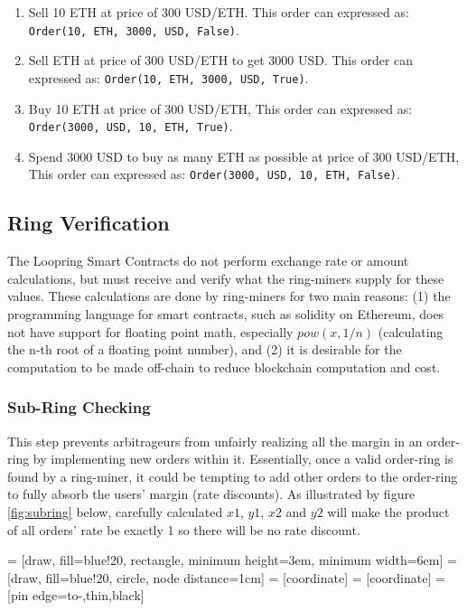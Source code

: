 \documentclass[UTF8,nofonts]{article}
\makeatletter
\newenvironment{figurehere}
 {\def\@captype{figure}}
 {}
\makeatother
\begin{document}
\begin{multicols}{2}
\begin{enumerate}
	\item Sell 10 ETH at price of 300 USD/ETH. This order can expressed as: \verb|Order(10, ETH, 3000, USD, False)|.
	\item Sell ETH at price of 300 USD/ETH to get 3000 USD. This order can expressed as: \verb|Order(10, ETH, 3000, USD, True)|.
	\item Buy 10 ETH at price of 300 USD/ETH, This order can expressed as: \verb|Order(3000, USD, 10, ETH, True)|.
	\item Spend 3000 USD to buy as many ETH as possible at price of 300 USD/ETH, This order can expressed as: \verb|Order(3000, USD, 10, ETH, False)|.
\end{enumerate}



\subsection{Ring Verification\label{sec:ring_verification}}

The Loopring Smart Contracts do not perform exchange rate or amount calculations, but must receive and verify what the ring-miners supply for these values. These calculations are done by ring-miners for two main reasons: (1) the programming language for smart contracts, such as solidity\cite{dannen2017introducing} on Ethereum, does not have support for floating point math, especially $pow(x, 1/n)$ (calculating the n-th root of a floating point number), and (2) it is desirable for the computation to be made off-chain to reduce blockchain computation and cost.


\subsubsection{Sub-Ring Checking\label{sec:sub_ring_check}}
This step prevents arbitrageurs from unfairly realizing all the margin in an order-ring by implementing new orders within it. Essentially, once a valid order-ring is found by a ring-miner, it could be tempting to add other orders to the order-ring to fully absorb the users' margin (rate discounts). As illustrated by figure \ref{fig:subring} below, carefully calculated $x1$, $y1$, $x2$ and $y2$ will make the product of all orders' rate be exactly 1 so there will be no rate discount. 

\begin{center}
\begin{figurehere}
\centering
{} = [draw, fill=blue!20, rectangle, 
    minimum height=3em, minimum width=6em]
 = [draw, fill=blue!20, circle, node distance=1cm]
 = [coordinate]
 = [coordinate]
 = [pin edge={to-,thin,black}]


\end{figurehere}
\end{center}
\end{multicols}
\end{document}
